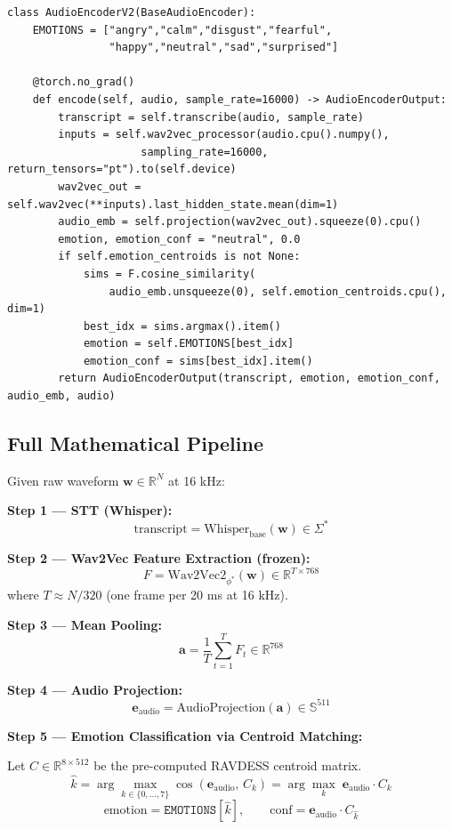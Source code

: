 \documentclass[12pt,a4paper]{article}
\theoremstyle{definition}
\theoremstyle{remark}
\begin{document}
\begin{lstlisting}[caption={\texttt{AudioEncoderV2} class (condensed)}]
class AudioEncoderV2(BaseAudioEncoder):
    EMOTIONS = ["angry","calm","disgust","fearful",
                "happy","neutral","sad","surprised"]

    @torch.no_grad()
    def encode(self, audio, sample_rate=16000) -> AudioEncoderOutput:
        transcript = self.transcribe(audio, sample_rate)
        inputs = self.wav2vec_processor(audio.cpu().numpy(),
                     sampling_rate=16000, return_tensors="pt").to(self.device)
        wav2vec_out = self.wav2vec(**inputs).last_hidden_state.mean(dim=1)
        audio_emb = self.projection(wav2vec_out).squeeze(0).cpu()
        emotion, emotion_conf = "neutral", 0.0
        if self.emotion_centroids is not None:
            sims = F.cosine_similarity(
                audio_emb.unsqueeze(0), self.emotion_centroids.cpu(), dim=1)
            best_idx = sims.argmax().item()
            emotion = self.EMOTIONS[best_idx]
            emotion_conf = sims[best_idx].item()
        return AudioEncoderOutput(transcript, emotion, emotion_conf, audio_emb, audio)
\end{lstlisting}

\subsection{Full Mathematical Pipeline}

Given raw waveform $\mathbf{w} \in \mathbb{R}^N$ at 16 kHz:

\textbf{Step 1 — STT (Whisper):}
\[
  \text{transcript} = \text{Whisper}_{\text{base}}(\mathbf{w}) \in \Sigma^*
\]

\textbf{Step 2 — Wav2Vec Feature Extraction (frozen):}
\[
  F = \text{Wav2Vec2}_{\phi^*}(\mathbf{w}) \in \mathbb{R}^{T \times 768}
\]
where $T \approx N / 320$ (one frame per 20 ms at 16 kHz).

\textbf{Step 3 — Mean Pooling:}
\[
  \mathbf{a} = \frac{1}{T}\sum_{t=1}^{T} F_t \in \mathbb{R}^{768}
\]

\textbf{Step 4 — Audio Projection:}
\[
  \mathbf{e}_{\text{audio}} = \text{AudioProjection}(\mathbf{a}) \in \mathbb{S}^{511}
\]

\textbf{Step 5 — Emotion Classification via Centroid Matching:}

Let $C \in \mathbb{R}^{8 \times 512}$ be the pre-computed RAVDESS centroid matrix.
\[
  \hat{k} = \arg\max_{k \in \{0,\ldots,7\}}
  \cos(\mathbf{e}_{\text{audio}},\, C_k)
  = \arg\max_{k}\; \mathbf{e}_{\text{audio}} \cdot C_k
\]
\[
  \text{emotion} = \texttt{EMOTIONS}[\hat{k}], \qquad
  \text{conf} = \mathbf{e}_{\text{audio}} \cdot C_{\hat{k}}
\]
\end{document}
